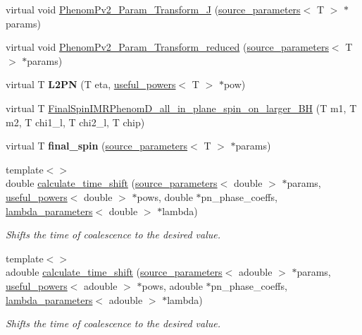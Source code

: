\begin{DoxyCompactItemize}
\item 
virtual void \hyperlink{classIMRPhenomPv2_a684f1bbc22773a72e8000de61c1b6def}{Phenom\+Pv2\+\_\+\+Param\+\_\+\+Transform\+\_\+J} (\hyperlink{structsource__parameters}{source\+\_\+parameters}$<$ T $>$ $\ast$params)
\item 
virtual void \hyperlink{classIMRPhenomPv2_a09917aef3521bd8e3b8d8516930077a0}{Phenom\+Pv2\+\_\+\+Param\+\_\+\+Transform\+\_\+reduced} (\hyperlink{structsource__parameters}{source\+\_\+parameters}$<$ T $>$ $\ast$params)
\item 
\mbox{\label{classIMRPhenomPv2_a5e64520f828d29beccdf5b1e5e18582c}} 
virtual T {\bfseries L2\+PN} (T eta, \hyperlink{structuseful__powers}{useful\+\_\+powers}$<$ T $>$ $\ast$pow)
\item 
virtual T \hyperlink{classIMRPhenomPv2_a36cbd07ab5b8c1663c7f8c8e75cf4e74}{Final\+Spin\+I\+M\+R\+Phenom\+D\+\_\+all\+\_\+in\+\_\+plane\+\_\+spin\+\_\+on\+\_\+larger\+\_\+\+BH} (T m1, T m2, T chi1\+\_\+l, T chi2\+\_\+l, T chip)
\item 
\mbox{\label{classIMRPhenomPv2_a3d37a40e4d1bce6ca673e6b30e64fe67}} 
virtual T {\bfseries final\+\_\+spin} (\hyperlink{structsource__parameters}{source\+\_\+parameters}$<$ T $>$ $\ast$params)
\item 
{\footnotesize template$<$$>$ }\\double \hyperlink{classIMRPhenomPv2_a6b27bd676726358b699a35cfbd10fe79}{calculate\+\_\+time\+\_\+shift} (\hyperlink{structsource__parameters}{source\+\_\+parameters}$<$ double $>$ $\ast$params, \hyperlink{structuseful__powers}{useful\+\_\+powers}$<$ double $>$ $\ast$pows, double $\ast$pn\+\_\+phase\+\_\+coeffs, \hyperlink{structlambda__parameters}{lambda\+\_\+parameters}$<$ double $>$ $\ast$lambda)
\begin{DoxyCompactList}\small\item\em Shifts the time of coalescence to the desired value. \end{DoxyCompactList}\item 
{\footnotesize template$<$$>$ }\\adouble \hyperlink{classIMRPhenomPv2_a61ec2bf7f72ec82b5a583e7098b2daab}{calculate\+\_\+time\+\_\+shift} (\hyperlink{structsource__parameters}{source\+\_\+parameters}$<$ adouble $>$ $\ast$params, \hyperlink{structuseful__powers}{useful\+\_\+powers}$<$ adouble $>$ $\ast$pows, adouble $\ast$pn\+\_\+phase\+\_\+coeffs, \hyperlink{structlambda__parameters}{lambda\+\_\+parameters}$<$ adouble $>$ $\ast$lambda)
\begin{DoxyCompactList}\small\item\em Shifts the time of coalescence to the desired value. \end{DoxyCompactList}\end{DoxyCompactItemize}


